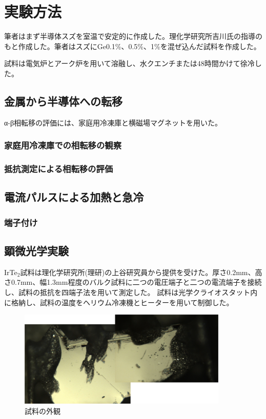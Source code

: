 \section{実験方法}
筆者はまず半導体スズを室温で安定的に作成した。理化学研究所吉川氏の指導のもと作成した。筆者はスズにGe0.1\%、0.5\%、1\%を混ぜ込んだ試料を作成した。


試料は電気炉とアーク炉を用いて溶融し、水クエンチまたは48時間かけて徐冷した。

\subsection{金属から半導体への転移}
α-β相転移の評価には、家庭用冷凍庫と横磁場マグネットを用いた。

\subsubsection{家庭用冷凍庫での相転移の観察}

\subsubsection{抵抗測定による相転移の評価}

\subsection{電流パルスによる加熱と急冷}

\subsubsection{端子付け}

\subsection{顕微光学実験}
IrTe$_2$試料は理化学研究所(理研)の上谷研究員から提供を受けた。厚さ0.2mm、高さ0.7mm、幅1.3mm程度のバルク試料に二つの電圧端子と二つの電流端子を接続し、試料の抵抗を四端子法を用いて測定した。
試料は光学クライオスタット内に格納し、試料の温度をヘリウム冷凍機とヒーターを用いて制御した。
\begin{figure}[htb]
  \begin{center}
   \includegraphics[width=100mm]{experiment/sample.eps}
  \end{center}
  \caption{試料の外観}
  \label{fig:sample}
\end{figure}

